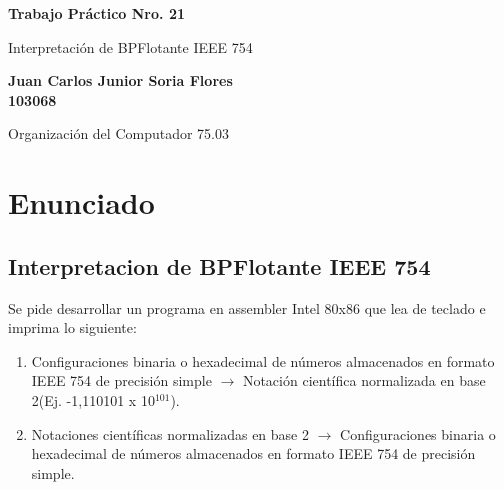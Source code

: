 \documentclass{article}
\begin{document}
\begin{titlepage}
   \begin{center}
       \vspace*{1cm}
 
       \textbf{Trabajo Práctico Nro. 21}
 
       \vspace{0.5cm}
        Interpretación de BPFlotante IEEE 754
 
       \vspace{1.5cm}
 
       \textbf{Juan Carlos Junior Soria Flores\\103068}
 
       \vfill
 
       Organización del Computador 75.03
  
   \end{center}
\end{titlepage}

\newpage
\tableofcontents

\newpage
\section{Enunciado}
\subsection{Interpretacion de BPFlotante IEEE 754}
Se pide desarrollar un programa en assembler Intel 80x86 que lea de teclado e imprima lo siguiente:
\begin{enumerate}
\item Configuraciones binaria o hexadecimal de números almacenados en formato IEEE 754 de precisión simple $\rightarrow$ Notación científica normalizada en base 2(Ej. -1,110101 x 10$^{101}$).
\item Notaciones científicas normalizadas en base 2 $\rightarrow$ Configuraciones binaria o hexadecimal de números almacenados en formato IEEE 754 de precisión simple.
\end{enumerate}

\newpage
\end{document}
